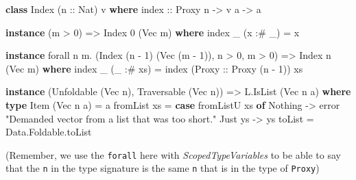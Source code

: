 \documentclass[]{article}
\newenvironment{Shaded}{}{}
\newcommand{\KeywordTok}[1]{\textcolor[rgb]{0.00,0.44,0.13}{\textbf{{#1}}}}
\newcommand{\DataTypeTok}[1]{\textcolor[rgb]{0.56,0.13,0.00}{{#1}}}
\newcommand{\DecValTok}[1]{\textcolor[rgb]{0.25,0.63,0.44}{{#1}}}
\newcommand{\StringTok}[1]{\textcolor[rgb]{0.25,0.44,0.63}{{#1}}}
\newcommand{\OtherTok}[1]{\textcolor[rgb]{0.00,0.44,0.13}{{#1}}}
\newcommand{\FunctionTok}[1]{\textcolor[rgb]{0.02,0.16,0.49}{{#1}}}
\newcommand{\NormalTok}[1]{{#1}}
\begin{document}
\begin{Shaded}
\begin{Highlighting}[]
\KeywordTok{class} \DataTypeTok{Index} \NormalTok{(}\OtherTok{n ::} \DataTypeTok{Nat}\NormalTok{) v }\KeywordTok{where}
\OtherTok{    index ::} \DataTypeTok{Proxy} \NormalTok{n }\OtherTok{->} \NormalTok{v a }\OtherTok{->} \NormalTok{a}

\KeywordTok{instance} \NormalTok{(m }\FunctionTok{>} \DecValTok{0}\NormalTok{) }\OtherTok{=>} \DataTypeTok{Index} \DecValTok{0} \NormalTok{(}\DataTypeTok{Vec} \NormalTok{m) }\KeywordTok{where}
    \NormalTok{index _ (x }\FunctionTok{:#} \NormalTok{_) }\FunctionTok{=} \NormalTok{x}

\KeywordTok{instance} \NormalTok{forall n m}\FunctionTok{.} \NormalTok{(}\DataTypeTok{Index} \NormalTok{(n }\FunctionTok{-} \DecValTok{1}\NormalTok{) (}\DataTypeTok{Vec} \NormalTok{(m }\FunctionTok{-} \DecValTok{1}\NormalTok{)), n }\FunctionTok{>} \DecValTok{0}\NormalTok{, m }\FunctionTok{>} \DecValTok{0}\NormalTok{) }\OtherTok{=>} \DataTypeTok{Index} \NormalTok{n (}\DataTypeTok{Vec} \NormalTok{m) }\KeywordTok{where}
    \NormalTok{index _ (_ }\FunctionTok{:#} \NormalTok{xs) }\FunctionTok{=} \NormalTok{index (}\DataTypeTok{Proxy}\OtherTok{ ::} \DataTypeTok{Proxy} \NormalTok{(n }\FunctionTok{-} \DecValTok{1}\NormalTok{)) xs}

\KeywordTok{instance} \NormalTok{(}\DataTypeTok{Unfoldable} \NormalTok{(}\DataTypeTok{Vec} \NormalTok{n), }\DataTypeTok{Traversable} \NormalTok{(}\DataTypeTok{Vec} \NormalTok{n)) }\OtherTok{=>} \DataTypeTok{L.IsList} \NormalTok{(}\DataTypeTok{Vec} \NormalTok{n a) }\KeywordTok{where}
    \KeywordTok{type} \DataTypeTok{Item} \NormalTok{(}\DataTypeTok{Vec} \NormalTok{n a) }\FunctionTok{=} \NormalTok{a}
    \NormalTok{fromList xs }\FunctionTok{=} \KeywordTok{case} \NormalTok{fromListU xs }\KeywordTok{of}
                    \DataTypeTok{Nothing} \OtherTok{->} \NormalTok{error }\StringTok{"Demanded vector from a list that was too short."}
                    \DataTypeTok{Just} \NormalTok{ys }\OtherTok{->} \NormalTok{ys}
    \NormalTok{toList      }\FunctionTok{=} \NormalTok{Data.Foldable.toList}
\end{Highlighting}
\end{Shaded}

(Remember, we use the \texttt{forall} here with
\emph{ScopedTypeVariables} to be able to say that the \texttt{n} in the
type signature is the same \texttt{n} that is in the type of
\texttt{Proxy})
\end{document}
